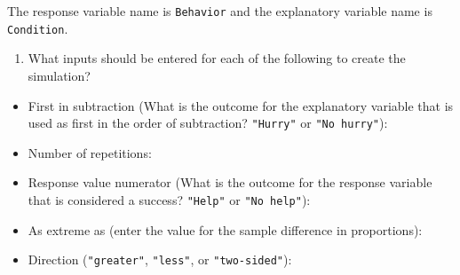 \documentclass[
]{report}
\providecommand{\tightlist}{%
  \setlength{\itemsep}{0pt}\setlength{\parskip}{0pt}}
\begin{document}
The response variable name is \texttt{Behavior} and the explanatory variable name is \texttt{Condition}.

\newpage

\begin{enumerate}
\def\labelenumi{\arabic{enumi}.}
\setcounter{enumi}{15}
\tightlist
\item
  What inputs should be entered for each of the following to create the simulation?
  \vspace{1mm}
\end{enumerate}

\begin{itemize}
\tightlist
\item
  First in subtraction (What is the outcome for the explanatory variable that is used as first in the order of subtraction? \texttt{"Hurry"} or \texttt{"No\ hurry"}):
\end{itemize}

\vspace{.15in}

\begin{itemize}
\tightlist
\item
  Number of repetitions:
\end{itemize}

\vspace{.15in}

\begin{itemize}
\tightlist
\item
  Response value numerator (What is the outcome for the response variable that is considered a success? \texttt{"Help"} or \texttt{"No\ help"}):
\end{itemize}

\vspace{.15in}

\begin{itemize}
\tightlist
\item
  As extreme as (enter the value for the sample difference in proportions):
\end{itemize}

\vspace{.15in}

\begin{itemize}
\tightlist
\item
  Direction (\texttt{"greater"}, \texttt{"less"}, or \texttt{"two-sided"}):
\end{itemize}

\vspace{.15in}
\end{document}
